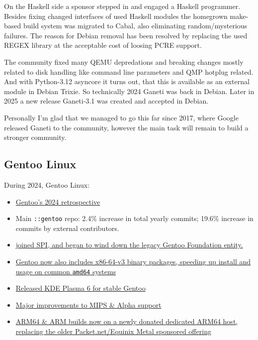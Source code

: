 \documentclass[a4paper]{report}
\begin{document}
On the Haskell side a sponsor stepped in and engaged a Haskell programmer. Besides fixing changed interfaces of used Haskell modules the homegrown make-based build system was migrated to Cabal, also eliminating random/mysterious failures. The reason for Debian removal has been resolved by replacing the used REGEX library at the acceptable cost of loosing PCRE support.

The community fixed many QEMU depredations and breaking changes mostly related to disk handling like command line parameters and QMP hotplug related. And with Python-3.12 asyncore it turns out, that this is available as an external module in Debian Trixie. So technically 2024 Ganeti was back in Debian. Later in 2025 a new release Ganeti-3.1 was created and accepted in Debian.

Personally I'm glad that we managed to go this far since 2017, where Google released Ganeti to the community, however the main task will remain to build a stronger community.

\subsection{Gentoo Linux}

During 2024, Gentoo Linux:

\begin{itemize}

\item \href{https://www.gentoo.org/news/2025/01/05/new-year.html}{Gentoo's 2024 retrospective}

\item Main {\tt ::gentoo} repo: 2.4\% increase in total yearly commits; 19.6\% increase in commits by external contributors.

\item \href{https://www.gentoo.org/news/2024/04/10/SPI-associated-project.html}{joined SPI, and began to wind down the legacy Gentoo Foundation entity.}

\item \href{https://www.gentoo.org/news/2024/02/04/x86-64-v3.html}{Gentoo now also includes x86-64-v3 binary packages, speeding up install and usage on common {\tt amd64} systems}

\item \href{https://www.gentoo.org/news/2024/08/31/KDE-Plasma-6-upgrade.html}{Released KDE Plasma 6 for stable Gentoo}

\item \href{https://www.gentoo.org/news/2024/09/11/Improved-MIPS-and-Alpha-support.html}{Major improvements to MIPS \& Alpha support}

\item \href{https://www.gentoo.org/news/2024/10/07/Arm-Ltd-provides-server.html}{ARM64 \& ARM builds now on a newly donated dedicated ARM64 host, replacing the older Packet.net/Equinix Metal sponsored offering}

\end{itemize}
\end{document}

